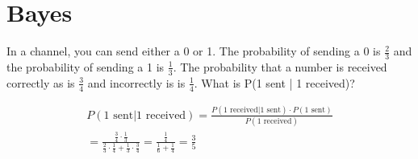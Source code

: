 \documentclass[11pt,a4paper,margin=1in]{article}
\begin{document}
\section{Bayes}
\begin{flushleft}
    In a channel, you can send either a 0 or 1. The probability of sending a 0 is 
    $\frac{2}{3}$ and the probability of sending a 1 is $\frac{1}{3}$. The probability
    that a number is received correctly as is $\frac{3}{4}$ and incorrectly is
    is $\frac{1}{4}$. What is P(1 sent | 1 received)?
\end{flushleft}
\begin{gather*}
    P(1 \text{ sent} | 1 \text{ received}) = \frac{P(1 \text{ received} | 1 \text{ sent}) \cdot P(1 \text{ sent})}{P(1 \text{ received})}\\
    = \frac{\frac{3}{4} \cdot \frac{1}{3}}{\frac{2}{3} \cdot \frac{1}{4} + \frac{1}{3} \cdot \frac{3}{4}}
    = \frac{\frac{1}{4}}{\frac{1}{6} + \frac{1}{4}}
    = \frac{3}{5}
\end{gather*}
\end{document}
